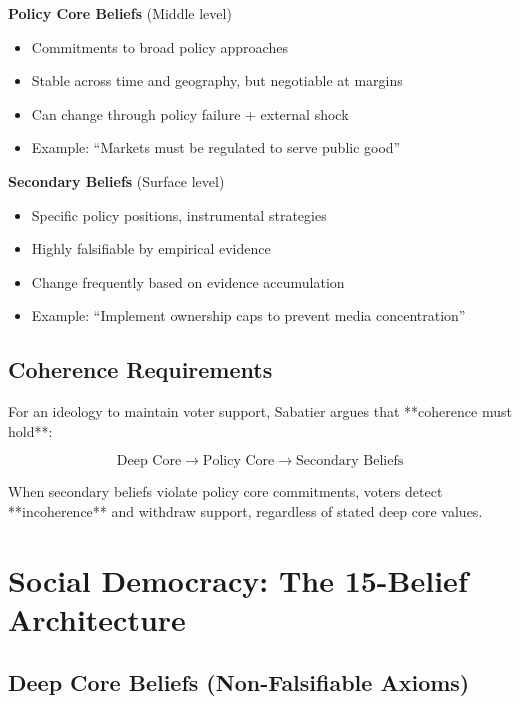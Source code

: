 \textbf{Policy Core Beliefs} (Middle level)
\begin{itemize}[nosep]
\item Commitments to broad policy approaches
\item Stable across time and geography, but negotiable at margins
\item Can change through policy failure + external shock
\item Example: ``Markets must be regulated to serve public good''
\end{itemize}

\textbf{Secondary Beliefs} (Surface level)
\begin{itemize}[nosep]
\item Specific policy positions, instrumental strategies
\item Highly falsifiable by empirical evidence
\item Change frequently based on evidence accumulation
\item Example: ``Implement ownership caps to prevent media concentration''
\end{itemize}

\subsection{Coherence Requirements}

For an ideology to maintain voter support, Sabatier argues that **coherence must hold**:

\begin{equation}
\text{Deep Core} \rightarrow \text{Policy Core} \rightarrow \text{Secondary Beliefs}
\end{equation}

When secondary beliefs violate policy core commitments, voters detect **incoherence** and withdraw support, regardless of stated deep core values.


\section{Social Democracy: The 15-Belief Architecture}
\label{sec:cj-architecture}

\subsection{Deep Core Beliefs (Non-Falsifiable Axioms)}

